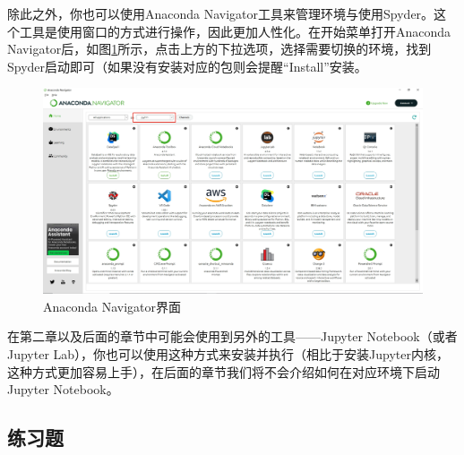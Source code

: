 \begin{extend}
    除此之外，你也可以使用Anaconda Navigator工具来管理环境与使用Spyder。这个工具是使用窗口的方式进行操作，因此更加人性化。在开始菜单打开Anaconda Navigator后，如图\ref{fig:安装Python-Anaconda Navigator界面}所示，点击上方的下拉选项，选择需要切换的环境，找到Spyder启动即可（如果没有安装对应的包则会提醒“Install”安装。

    \begin{figure}
        \centering
        \includegraphics[width=1\linewidth]{Python与机器学习/基础Python语法/安装Python/fig/Anaconda Navigator界面.png}
        \caption{Anaconda Navigator界面}
        \label{fig:安装Python-Anaconda Navigator界面}
    \end{figure}

    在第二章以及后面的章节中可能会使用到另外的工具——Jupyter Notebook（或者Jupyter Lab），你也可以使用这种方式来安装并执行（相比于安装Jupyter内核，这种方式更加容易上手），在后面的章节我们将不会介绍如何在对应环境下启动Jupyter Notebook。
\end{extend}



\subsection{练习题}\label{subsec:安装Python-练习题}

